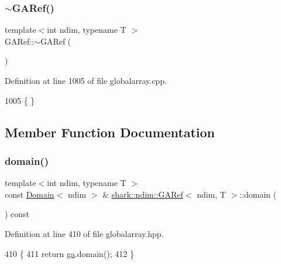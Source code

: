 \subsubsection{\texorpdfstring{$\sim$\+G\+A\+Ref()}{~GARef()}}
{\footnotesize\ttfamily template$<$int ndim, typename T $>$ \\
G\+A\+Ref\+::$\sim$\+G\+A\+Ref (\begin{DoxyParamCaption}{ }\end{DoxyParamCaption})}



Definition at line 1005 of file globalarray.\+cpp.


\begin{DoxyCode}
1005 \{ \}
\end{DoxyCode}


\subsection{Member Function Documentation}
\hypertarget{classshark_1_1ndim_1_1_g_a_ref_aac65b9779fa791e2091e6a04419b972f}{}\label{classshark_1_1ndim_1_1_g_a_ref_aac65b9779fa791e2091e6a04419b972f} 
\subsubsection{\texorpdfstring{domain()}{domain()}}
{\footnotesize\ttfamily template$<$int ndim, typename T $>$ \\
const \hyperlink{classshark_1_1ndim_1_1_domain}{Domain}$<$ ndim $>$ \& \hyperlink{classshark_1_1ndim_1_1_g_a_ref}{shark\+::ndim\+::\+G\+A\+Ref}$<$ ndim, T $>$\+::domain (\begin{DoxyParamCaption}{ }\end{DoxyParamCaption}) const\hspace{0.3cm}{\ttfamily [inline]}}



Definition at line 410 of file globalarray.\+hpp.


\begin{DoxyCode}
410                                                                \{
411             \textcolor{keywordflow}{return} \hyperlink{classshark_1_1ndim_1_1_g_a_ref_ad52c83aede31478298662b70dcc781d7}{ga}.domain();
412         \}
\end{DoxyCode}
\hypertarget{classshark_1_1ndim_1_1_g_a_ref_a8e91514ad426ea441967f47e144f3e2f}{}\label{classshark_1_1ndim_1_1_g_a_ref_a8e91514ad426ea441967f47e144f3e2f} 
